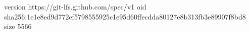 version https://git-lfs.github.com/spec/v1
oid sha256:1e1e8ed9d772ef5798555925c1e95d60ffecdda80127e8b313fb3e89907f8bd8
size 5566
